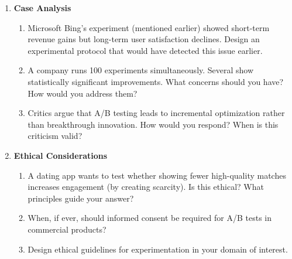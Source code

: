 \begin{enumerate}
    \item \textbf{Case Analysis}
    \begin{enumerate}
        \item Microsoft Bing's experiment (mentioned earlier) showed short-term revenue gains but long-term user satisfaction declines. Design an experimental protocol that would have detected this issue earlier.
        \item A company runs 100 experiments simultaneously. Several show statistically significant improvements. What concerns should you have? How would you address them?
        \item Critics argue that A/B testing leads to incremental optimization rather than breakthrough innovation. How would you respond? When is this criticism valid?
    \end{enumerate}

    \item \textbf{Ethical Considerations}
    \begin{enumerate}
        \item A dating app wants to test whether showing fewer high-quality matches increases engagement (by creating scarcity). Is this ethical? What principles guide your answer?
        \item When, if ever, should informed consent be required for A/B tests in commercial products?
        \item Design ethical guidelines for experimentation in your domain of interest.
    \end{enumerate}
\end{enumerate}
